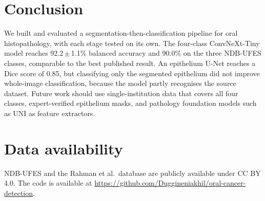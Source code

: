 \documentclass[10pt,twocolumn]{article}
\begin{document}
\section{Conclusion}

We built and evaluated a segmentation-then-classification pipeline for oral histopathology, with each stage tested on its own. The four-class ConvNeXt-Tiny model reaches 92.2\,$\pm$\,1.1\% balanced accuracy and 90.0\% on the three NDB-UFES classes, comparable to the best published result. An epithelium U-Net reaches a Dice score of 0.85, but classifying only the segmented epithelium did not improve whole-image classification, because the model partly recognises the source dataset. Future work should use single-institution data that covers all four classes, expert-verified epithelium masks, and pathology foundation models such as UNI \citep{chen2024} as feature extractors.

\section*{Data availability}
NDB-UFES and the Rahman et al.\ database are publicly available under CC BY 4.0. The code is available at \url{https://github.com/Duggineniakhil/oral-cancer-detection}.
\end{document}
